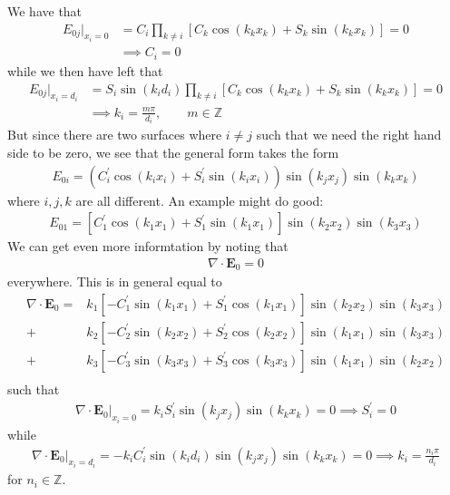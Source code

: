 We have that \begin{align*}
    E_{0j}\bigr|_{x_i = 0} &= C_i \prod_{k \neq i} \left[ C_k \cos (k_k x_k) + S_k \sin (k_k x_k) \right] = 0 \\
    &\implies C_i = 0
\end{align*} 
while we then have left that \begin{align*}
    E_{0j}\bigr|_{x_i = d_i} &= S_i \sin (k_i d_i) \prod_{k \neq i}\left[ C_k \cos (k_k x_k) + S_k \sin (k_k x_k) \right] = 0\\
    &\implies k_i = \frac{m \pi }{d_i}, \qquad m \in \mathbb{Z} 
\end{align*}
But since there are two surfaces where \(i \neq j\) such that we need the right hand side to be zero, we see that the general form takes the form 
\begin{align*}
    E_{0i} = \left( C^{\prime}_i \cos (k_i x_i) + S^{\prime}_i \sin(k_i x_i)  \right)\sin (k_j x_j) \sin (k_k x_k)  
\end{align*} 
where \(i,j,k\) are all different. An example might do good:
\begin{align*}
    E_{01} = \left[ C^{\prime}_1 \cos (k_1 x_1) + S^{\prime} _1 \sin (k_1 x_1) \right]\sin (k_2 x_2) \sin (k_3 x_3)  
\end{align*} 
We can get even more informtation by noting that \begin{align*}
    \nabla \cdot \mathbf{E}_0 = 0
\end{align*}
everywhere. This is in general equal to \begin{align*}
   \nabla \cdot \mathbf{E}_0 = &k_{1}\left[ -C^{\prime} _1 \sin (k_1 x_1) + S^{\prime} _1 \cos (k_1 x_1) \right] \sin (k_2 x_2) \sin (k_3 x_3)\\
    + &k_2 \left[ -C^{\prime} _2 \sin (k_2 x_2) + S^{\prime} _2 \cos (k_2 x_2) \right] \sin (k_1 x_1) \sin (k_3 x_3)\\
    + &k_3 \left[ -C^{\prime} _3 \sin (k_3 x_3) + S^{\prime} _3 \cos (k_3 x_3) \right] \sin (k_1 x_1) \sin (k_2 x_2)\\
\end{align*}
such that \begin{align*}
    \nabla \cdot \mathbf{E}_0 \bigr|_{x_i = 0} = k_i S^{\prime} _i \sin (k_j x_j)\sin (k_k x_k) = 0 \implies S^{\prime} _i = 0
\end{align*}
while \begin{align*}
    \nabla \cdot \mathbf{E}_0 \bigr|_{x_i = d_i} = -k_iC^{\prime} _i \sin (k_i d_i) \sin (k_j x_j) \sin (k_k x_k) = 0 \implies k_i = \frac{n_i \pi }{d_i}
\end{align*}
for \(n_i \in \mathbb{Z}\).

